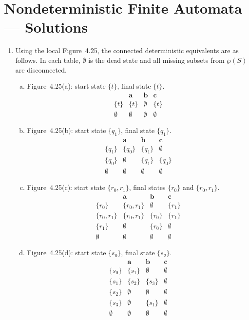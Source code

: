
\chapter{Nondeterministic Finite Automata --- Solutions}

\begin{enumerate}[{4.}1.]

\item Using the local Figure~4.25, the connected deterministic equivalents are
as follows.  In each table, $\emptyset$ is the dead state and all missing
subsets from $\wp(S)$ are disconnected.

\begin{enumerate}[(a)]
\item Figure~4.25(a): start state $\{t\}$, final state $\{t\}$.
\[
\begin{array}{c|ccc}
 & \pmb{a} & \pmb{b} & \pmb{c}\\\hline
\{t\} & \{t\} & \emptyset & \{t\}\\
\emptyset & \emptyset & \emptyset & \emptyset
\end{array}
\]

\item Figure~4.25(b): start state $\{q_1\}$, final state $\{q_1\}$.
\[
\begin{array}{c|ccc}
 & \pmb{a} & \pmb{b} & \pmb{c}\\\hline
\{q_1\} & \{q_0\} & \{q_1\} & \emptyset\\
\{q_0\} & \emptyset & \{q_1\} & \{q_0\}\\
\emptyset & \emptyset & \emptyset & \emptyset
\end{array}
\]

\item Figure~4.25(c): start state $\{r_0,r_1\}$, final states $\{r_0\}$ and
$\{r_0,r_1\}$.
\[
\begin{array}{c|ccc}
 & \pmb{a} & \pmb{b} & \pmb{c}\\\hline
\{r_0\} & \{r_0,r_1\} & \emptyset & \{r_1\}\\
\{r_0,r_1\} & \{r_0,r_1\} & \{r_0\} & \{r_1\}\\
\{r_1\} & \emptyset & \{r_0\} & \emptyset\\
\emptyset & \emptyset & \emptyset & \emptyset
\end{array}
\]

\item Figure~4.25(d): start state $\{s_0\}$, final state $\{s_2\}$.
\[
\begin{array}{c|ccc}
 & \pmb{a} & \pmb{b} & \pmb{c}\\\hline
\{s_0\} & \{s_1\} & \emptyset & \emptyset\\
\{s_1\} & \{s_2\} & \{s_3\} & \emptyset\\
\{s_2\} & \emptyset & \emptyset & \emptyset\\
\{s_3\} & \emptyset & \{s_1\} & \emptyset\\
\emptyset & \emptyset & \emptyset & \emptyset
\end{array}
\]


\end{enumerate}
\end{enumerate}
